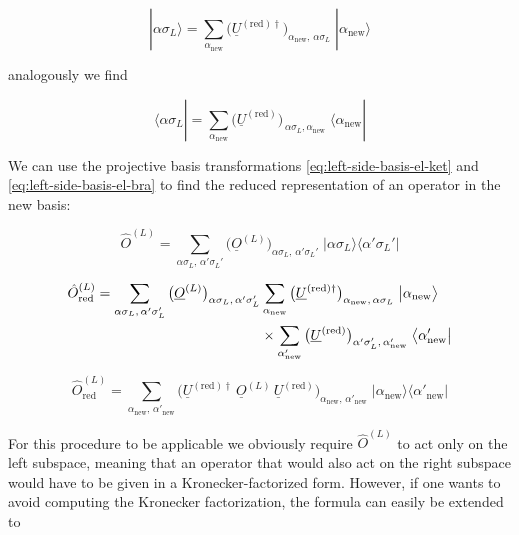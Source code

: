 \begin{equation}\label{eq:left-side-basis-el-ket}
\boxed{\;|\alpha\sigma_L\rangle = \sum_{\alpha_{\mathrm{new}}}\big(\underline{U}^{(\mathrm{red})\dagger}\big)_{\alpha_{\mathrm{new}},\,\alpha\sigma_L}\;|\alpha_{\mathrm{new}}\rangle\;}
\end{equation}

analogously we find

\begin{equation}\label{eq:left-side-basis-el-bra}
\boxed{\;\langle\alpha\sigma_L| = \sum_{\alpha_{\mathrm{new}}}\big(\underline{U}^{(\mathrm{red})}\big)_{\,\alpha\sigma_L,\alpha_{\mathrm{new}}}\;\langle\alpha_{\mathrm{new}}|\;}
\end{equation}

We can use the projective basis transformations \eqref{eq:left-side-basis-el-ket} and
\eqref{eq:left-side-basis-el-bra} to find the reduced representation of an operator
in the new basis:

\begin{equation}
\hat O^{(L)} = \sum_{\alpha\sigma_L,\,\alpha'\sigma_L'}
\big(\underline{O}^{(L)}\big)_{\alpha\sigma_L,\,\alpha'\sigma_L'}\;
\big|\alpha\sigma_L\big\rangle\big\langle\alpha'\sigma_L'\big|
\end{equation}

\begin{align}
\hat O^{(L)}_{\mathrm{red}} = \sum_{\alpha\sigma_L,\,\alpha'\sigma_L'}
\big(\underline{O}^{(L)}\big)_{\alpha\sigma_L,\,\alpha'\sigma_L'}
&\sum_{\alpha_{\mathrm{new}}}\big(\underline{U}^{(\mathrm{red})\dagger}\big)_{\alpha_{\mathrm{new}},\,\alpha\sigma_L}\;\big|\alpha_{\mathrm{new}}\big\rangle\notag\\
&\times\sum_{\alpha'_{\mathrm{new}}}\big(\underline{U}^{(\mathrm{red})}\big)_{\alpha'\sigma_L',\,\alpha'_{\mathrm{new}}}\;\big\langle\alpha'_{\mathrm{new}}\big|
\end{align}

\begin{equation}\label{eq:projective-basis-trafo-left}
\boxed{\;\hat O^{(L)}_{\mathrm{red}} = \sum_{\alpha_{\mathrm{new}},\,\alpha'_{\mathrm{new}}}
\Big(\underline{U}^{(\mathrm{red})\dagger}\,\underline{O}^{(L)}\,\underline{U}^{(\mathrm{red})}\Big)_{\alpha_{\mathrm{new}},\,\alpha'_{\mathrm{new}}}\;
\big|\alpha_{\mathrm{new}}\big\rangle\big\langle\alpha'_{\mathrm{new}}\big|\;}
\end{equation}

For this procedure to be applicable we obviously require $\hat O^{(L)}$
to act only on the left subspace, meaning that an operator that would
also act on the right subspace would have to be given in a
Kronecker-factorized form. However, if one wants to avoid computing the
Kronecker factorization, the formula can easily be extended to

